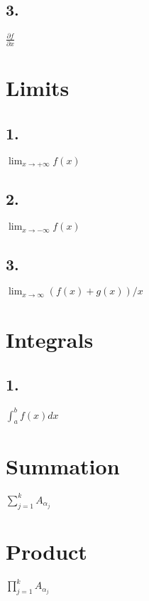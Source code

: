 \subsection*{3.}
$\frac{\partial f}{\partial x}$

\section*{Limits}

\subsection*{1.}
$\lim_{x \to +\infty} f(x)$

\subsection*{2.}
$\lim_{x \to -\infty} f(x)$

\subsection*{3.}
$\lim_{x \to \infty} ( f(x) + g(x) )/x$

\section*{Integrals}
\subsection*{1.}
$\int_{a}^b f(x)dx$


\section*{Summation}

$\sum_{j=1}^k A_{\alpha_j}$




\section*{Product}
$\prod_{j=1}^k A_{\alpha_j}$


